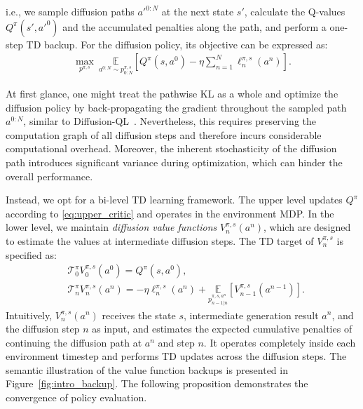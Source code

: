 i.e., we sample diffusion paths $a'^{0:N}$ at the next state $s'$, calculate the Q-values $Q^\pi(s', a'^0)$ and the accumulated penalties along the path, and perform a one-step TD backup. For the diffusion policy, its objective can be expressed as:
\begin{equation}\label{problem:path_diff}
    \begin{aligned}
        \max_{p^{\pi,s}}\ 
        \underset{{a^{0:N}\sim p^{\pi,s}_{0:N}}}{\mathbb{E}}\left[Q^\pi(s, a^0)-\eta\sum_{n=1}^N\ell^{\pi,s}_{n}(a^n)\right].
    \end{aligned}
\end{equation}

At first glance, one might treat the pathwise KL as a whole and optimize the diffusion policy by back-propagating the gradient throughout the sampled path $a^{0:N}$, similar to Diffusion-QL~\citep{dql}. Nevertheless, this requires preserving the computation graph of all diffusion steps and therefore incurs considerable computational overhead. Moreover, the inherent stochasticity of the diffusion path introduces significant variance during optimization, which can hinder the overall performance. 

Instead, we opt for a bi-level TD learning framework. The upper level updates $Q^\pi$ according to \eqref{eq:upper_critic} and operates in the environment MDP. In the lower level, we maintain \textit{diffusion value functions} $V^{\pi, s}_n(a^n)$, which are designed to estimate the values at intermediate diffusion steps. The TD target of $V^{\pi,s}_{n}$ is specified as:
\begin{equation}\label{eq:intermediate_value}
    \begin{aligned}
        &\mathcal{T}_0^{\pi}V_0^{\pi,s}(a^0)=Q^\pi(s,a^0),\\
        &\mathcal{T}_n^{\pi}V_n^{\pi,s}(a^n)=-\eta \ell^{\pi,s}_n(a^n)+\underset{ p^{\pi,s,a^n}_{n-1|n}}{\mathbb{E}}\left[V_{n-1}^{\pi,s}(a^{n-1})\right].
    \end{aligned}
\end{equation}
Intuitively, $V^{\pi, s}_n(a^n)$ receives the state $s$, intermediate generation result $a^n$, and the diffusion step $n$ as input, and estimates the expected cumulative penalties of continuing the diffusion path at $a^n$ and step $n$. It operates completely inside each environment timestep and performs TD updates across the diffusion steps. The semantic illustration of the value function backups is presented in Figure~\ref{fig:intro_backup}. The following proposition demonstrates the convergence of policy evaluation. 

